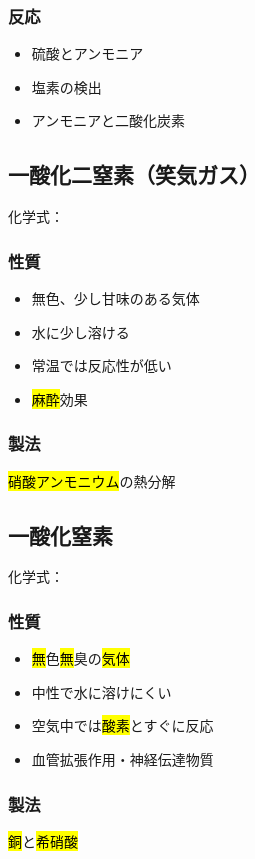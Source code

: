 \subsubsection{反応}
\begin{itemize}
  \item 硫酸とアンモニア\\
  \item 塩素の検出\\
  \item アンモニアと二酸化炭素\\
\end{itemize}
\subsection{一酸化二窒素（笑気ガス）}
化学式：\hl{}
\subsubsection{性質}
\begin{itemize}
  \item 無色、少し甘味のある気体
  \item 水に少し溶ける
  \item 常温では反応性が低い
  \item \hl{麻酔}効果
\end{itemize}
\subsubsection{製法}
\hl{硝酸アンモニウム}の熱分解\\
\subsection{一酸化窒素}
化学式：\hl{}
\subsubsection{性質}
\begin{itemize}
  \item \hl{無}色\hl{無}臭の\hl{気体}
  \item 中性で水に溶けにくい
  \item 空気中では\hl{酸素}とすぐに反応
  \item 血管拡張作用・神経伝達物質
\end{itemize}
\subsubsection{製法}
\hl{銅}と\hl{希硝酸}\\

